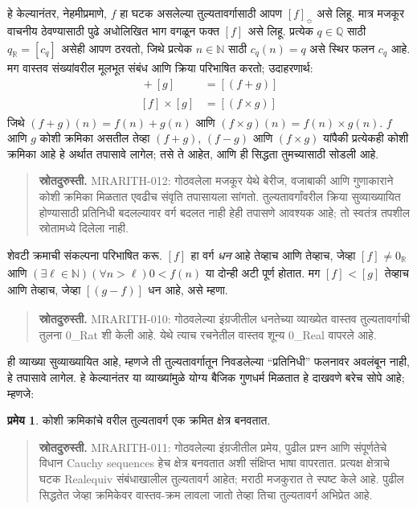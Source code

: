 \documentclass[11pt,a4paper,openany]{book}
\theoremstyle{definition}
\newtheorem{thm}[defn]{प्रमेय}
\newcommand{\Nat}{\mathbb{N}}
\newcommand{\Rat}{\mathbb{Q}}
\newcommand{\Real}{\mathbb{R}}
\newcommand{\equivrep}[2]{[#1]_{#2}}
\newcommand{\Realequiv}{\Bumpeq}
\begin{document}
हे केल्यानंतर, नेहमीप्रमाणे, $f$ हा घटक असलेल्या तुल्यतावर्गासाठी
आपण $\equivrep{f}{\Realequiv}$ असे लिहू. मात्र मजकूर वाचनीय ठेवण्यासाठी
पुढे अधोलिखित भाग वगळून फक्त $\equivrep{f}{}$ असे लिहू. प्रत्येक $q
\in \Rat$ साठी $q_{\Real} = \equivrep{c_{q}}{}$ असेही आपण ठरवतो,
जिथे प्रत्येक $n \in \Nat$ साठी $c_q(n) = q$ असे स्थिर फलन $c_{q}$
आहे. मग वास्तव संख्यांवरील मूलभूत संबंध आणि क्रिया परिभाषित करतो;
उदाहरणार्थ:
\begin{align*}
	\equivrep{f}{} + \equivrep{g}{} &= 	\equivrep{(f + g)}{} \\
	\equivrep{f}{} \times 	\equivrep{g}{} &= \equivrep{(f \times g)}{}
\end{align*}
जिथे $(f + g)(n) = f(n) + g(n)$ आणि $(f \times g)(n) = f(n) \times
g(n)$. $f$ आणि $g$ कोशी क्रमिका असतील तेव्हा $(f + g)$, $(f-g)$ आणि
$(f\times g)$ यांपैकी प्रत्येकही कोशी क्रमिका आहे हे अर्थात तपासावे
लागेल; तसे ते आहेत, आणि ही सिद्धता तुमच्यासाठी सोडली आहे.
\begin{quote}\small\textbf{स्रोतदुरुस्ती.} MRARITH-012: गोठवलेला मजकूर येथे बेरीज, वजाबाकी आणि गुणाकाराने कोशी क्रमिका मिळतात एवढीच संवृति तपासायला सांगतो. तुल्यतावर्गांवरील क्रिया सुव्याख्यायित होण्यासाठी प्रतिनिधी बदलल्यावर वर्ग बदलत नाही हेही तपासणे आवश्यक आहे; तो स्वतंत्र तपशील स्रोतामध्ये दिलेला नाही.\end{quote}

शेवटी क्रमाची संकल्पना परिभाषित करू. $\equivrep{f}{}$ हा वर्ग
\emph{धन} आहे तेव्हाच आणि तेव्हाच, जेव्हा $\equivrep{f}{}\neq 0_\Real$
आणि $(\exists \ell \in \Nat)(\forall n > \ell)0 < f(n)$
या दोन्ही अटी पूर्ण होतात. मग $\equivrep{f}{} <
\equivrep{g}{}$ तेव्हाच आणि तेव्हाच, जेव्हा $\equivrep{(g - f)}{}$
धन आहे, असे म्हणा.
\begin{quote}\small\textbf{स्रोतदुरुस्ती.} MRARITH-010: गोठवलेल्या इंग्रजीतील धनतेच्या व्याख्येत वास्तव तुल्यतावर्गाची तुलना 0\_Rat शी केली आहे. येथे त्याच रचनेतील वास्तव शून्य 0\_Real वापरले आहे.\end{quote}
ही व्याख्या सुव्याख्यायित आहे, म्हणजे ती तुल्यतावर्गातून निवडलेल्या
“प्रतिनिधी” फलनावर अवलंबून नाही, हे तपासावे लागेल.
हे केल्यानंतर या व्याख्यांमुळे योग्य बैजिक गुणधर्म मिळतात हे दाखवणे
बरेच सोपे आहे; म्हणजे:
\begin{thm}\label{sfr:arith:cauchy:thm:cauchyorderedfield}
कोशी क्रमिकांचे वरील तुल्यतावर्ग एक क्रमित क्षेत्र बनवतात.
\end{thm}
\begin{quote}\small\textbf{स्रोतदुरुस्ती.} MRARITH-011: गोठवलेल्या इंग्रजीतील प्रमेय, पुढील प्रश्न आणि संपूर्णतेचे विधान Cauchy sequences हेच क्षेत्र बनवतात अशी संक्षिप्त भाषा वापरतात. प्रत्यक्ष क्षेत्राचे घटक Realequiv संबंधाखालील तुल्यतावर्ग आहेत; मराठी मजकुरात ते स्पष्ट केले आहे. पुढील सिद्धतेत जेव्हा क्रमिकेवर वास्तव-क्रम लावला जातो तेव्हा तिचा तुल्यतावर्ग अभिप्रेत आहे.\end{quote}
\end{document}
